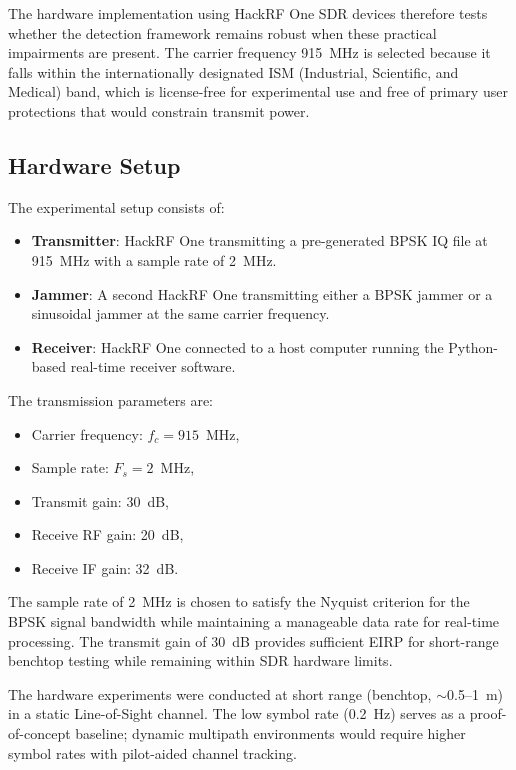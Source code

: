 \documentclass{article}
\begin{document}
The hardware implementation using HackRF One SDR devices therefore tests whether the detection framework remains robust when these practical impairments are present. The carrier frequency 915~MHz is selected because it falls within the internationally designated ISM (Industrial, Scientific, and Medical) band, which is license-free for experimental use and free of primary user protections that would constrain transmit power.

\subsection{Hardware Setup}

The experimental setup consists of:

\begin{itemize}
\item \textbf{Transmitter}: HackRF One transmitting a pre-generated BPSK IQ file at 915~MHz with a sample rate of 2~MHz.
\item \textbf{Jammer}: A second HackRF One transmitting either a BPSK jammer or a sinusoidal jammer at the same carrier frequency.
\item \textbf{Receiver}: HackRF One connected to a host computer running the Python-based real-time receiver software.
\end{itemize}

The transmission parameters are:

\begin{itemize}
\item Carrier frequency: $f_c = 915$~MHz,
\item Sample rate: $F_s = 2$~MHz,
\item Transmit gain: 30~dB,
\item Receive RF gain: 20~dB,
\item Receive IF gain: 32~dB.
\end{itemize}

The sample rate of 2~MHz is chosen to satisfy the Nyquist criterion for the BPSK signal bandwidth while maintaining a manageable data rate for real-time processing. The transmit gain of 30~dB provides sufficient EIRP for short-range benchtop testing while remaining within SDR hardware limits.

The hardware experiments were conducted at short range (benchtop, $\sim$0.5--1~m) in a static Line-of-Sight channel. The low symbol rate (0.2~Hz) serves as a proof-of-concept baseline; dynamic multipath environments would require higher symbol rates with pilot-aided channel tracking.
\end{document}
